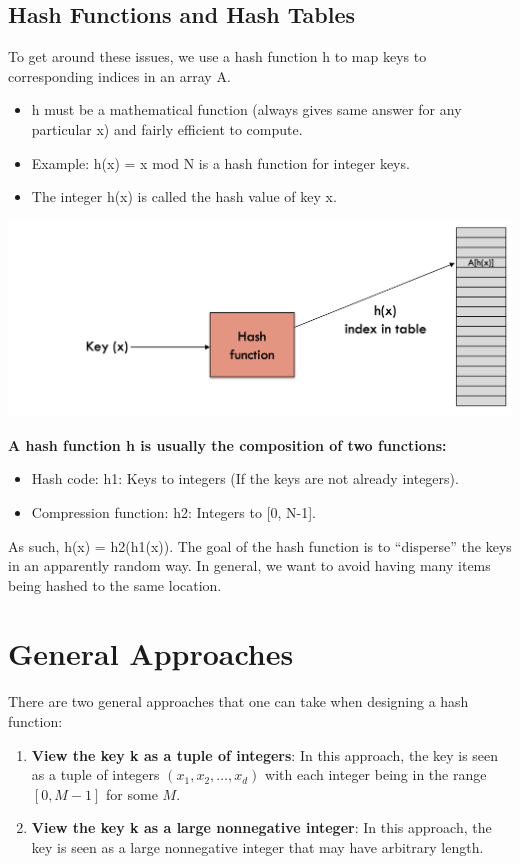 \documentclass[12pt]{article}
\newcommand{\1}{\space \quad}
\newcommand{\2}{\quad \quad \quad}
\newcommand{\3}{\quad \quad \quad \quad \space}
\newcommand{\4}{\quad \quad \quad \quad \quad \quad}
\begin{document}
\subsection{Hash Functions and Hash Tables}
To get around these issues, we use a hash function h to map keys to corresponding indices in an array A.
\begin{itemize}
  \item h must be a mathematical function (always gives same answer for any particular x) and fairly efficient to compute.
  \item Example: h(x) = x mod N is a hash function for integer keys.
  \item The integer h(x) is called the hash value of key x.
\end{itemize}
\includegraphics[width=\textwidth]{image12.png}

\textbf{A hash function h is usually the composition of two functions:}
\begin{itemize}
  \item Hash code: h1: Keys to integers (If the keys are not already integers).
  \item Compression function: h2: Integers to [0, N-1].
\end{itemize}
As such, h(x) = h2(h1(x)). The goal of the hash function is to “disperse” the keys in an apparently random way. In general, we want to 
avoid having many items being hashed to the same location.

\section{General Approaches}
There are two general approaches that one can take when designing a hash function:

\begin{enumerate}
\item \textbf{View the key k as a tuple of integers}: In this approach, the key is seen as a tuple of integers $(x_1, x_2, \ldots, x_d)$ 
with each integer being in the range $[0, M-1]$ for some $M$.
\item \textbf{View the key k as a large nonnegative integer}: In this approach, the key is seen as a large nonnegative integer that 
may have arbitrary length.
\end{enumerate}
\end{document}
